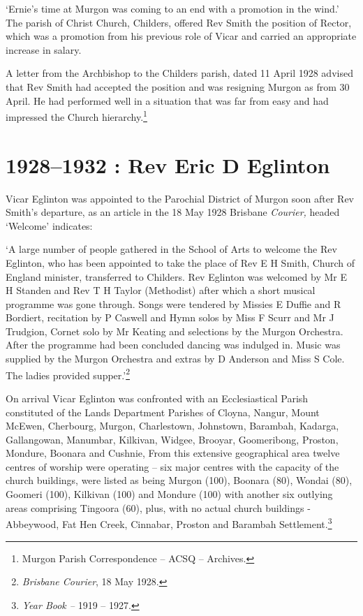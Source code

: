 `Ernie's time at Murgon was coming to an end with a promotion in the
wind.' The parish of Christ Church, Childers, offered Rev Smith the
position of Rector, which was a promotion from his previous role of
Vicar and carried an appropriate increase in salary.

A letter from the Archbishop to the Childers parish, dated 11 April 1928
advised that Rev Smith had accepted the position and was resigning
Murgon as from 30 April. He had performed well in a situation that was
far from easy and had impressed the Church hierarchy.\footnote{Murgon
  Parish Correspondence -- ACSQ -- Archives.}

\printendnotes[custom]
\setcounter{endnote}{0}
\chapter{1928--1932 : Rev Eric D Eglinton}

Vicar Eglinton was appointed to the Parochial District of Murgon soon
after Rev Smith's departure, as an article in the 18 May 1928 Brisbane
\emph{Courier,} headed `Welcome' indicates:

`A large number of people gathered in the School of Arts to welcome the
Rev Eglinton, who has been appointed to take the place of Rev E H Smith,
Church of England minister, transferred to Childers. Rev Eglinton was
welcomed by Mr E H Standen and Rev T H Taylor (Methodist) after which a
short musical programme was gone through. Songs were tendered by Missies
E Duffie and R Bordiert, recitation by P Caswell and Hymn solos by Miss
F Scurr and Mr J Trudgion, Cornet solo by Mr Keating and selections by
the Murgon Orchestra. After the programme had been concluded dancing was
indulged in. Music was supplied by the Murgon Orchestra and extras by D
Anderson and Miss S Cole. The ladies provided supper.'\footnote{\emph{Brisbane
  Courier}, 18 May 1928.}

On arrival Vicar Eglinton was confronted with an Ecclesiastical Parish
constituted of the Lands Department Parishes of Cloyna, Nangur, Mount
McEwen, Cherbourg, Murgon, Charlestown, Johnstown, Barambah, Kadarga,
Gallangowan, Manumbar, Kilkivan, Widgee, Brooyar, Goomeribong, Proston,
Mondure, Boonara and Cushnie, From this extensive geographical area
twelve centres of worship were operating -- six major centres with the
capacity of the church buildings, were listed as being Murgon (100),
Boonara (80), Wondai (80), Goomeri (100), Kilkivan (100) and Mondure
(100) with another six outlying areas comprising Tingoora (60), plus,
with no actual church buildings - Abbeywood, Fat Hen Creek, Cinnabar,
Proston and Barambah Settlement.\footnote{\emph{Year Book --} 1919 --
  1927.}

